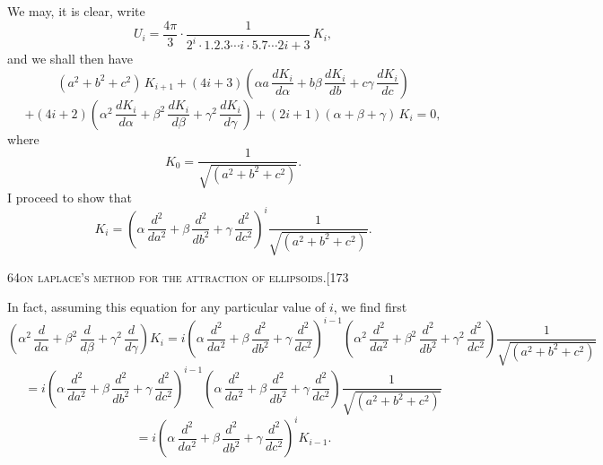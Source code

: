 \documentclass[11pt]{article}
\begin{document}
We may, it is clear, write
\[
U_{i} = \frac{4\pi}{3}\cdot\frac{1}{2^{i}\cdot 1.2.3 \cdots i\cdot 5.7 \cdots 2i + 3}\,K_{i},
\]
and we shall then have
\[
(a^{2} + b^{2} + c^{2})\,K_{i+1} + (4i + 3)\left(\alpha a\,\frac{dK_{i}}{d\alpha} + b\beta\,\frac{dK_{i}}{db} + c\gamma\,\frac{dK_{i}}{dc}\right)
\]
\[
+ (4i + 2)\left(\alpha^{2}\,\frac{dK_{i}}{d\alpha} + \beta^{2}\,\frac{dK_{i}}{d\beta} + \gamma^{2}\,\frac{dK_{i}}{d\gamma}\right) + (2i + 1)(\alpha + \beta + \gamma)\,K_{i} = 0,
\]
where
\[
K_{0} = \frac{1}{\sqrt{(a^{2} + b^{2} + c^{2})}}.
\]
I proceed to show that
\[
K_{i} = \left(\alpha\,\frac{d^{2}}{da^{2}} + \beta\,\frac{d^{2}}{db^{2}} + \gamma\,\frac{d^{2}}{dc^{2}}\right)^{i}\frac{1}{\sqrt{(a^{2} + b^{2} + c^{2})}}.
\]

\newpage

\begin{center}
\small\textsc{64}\hfill\textsc{on laplace's method for the attraction of ellipsoids.}\hfill[173
\end{center}

\medskip

\noindent In fact, assuming this equation for any particular value of $i$, we find first
\[
\left(\alpha^{2}\,\frac{d}{d\alpha} + \beta^{2}\,\frac{d}{d\beta} + \gamma^{2}\,\frac{d}{d\gamma}\right)K_{i} = i\left(\alpha\,\frac{d^{2}}{da^{2}} + \beta\,\frac{d^{2}}{db^{2}} + \gamma\,\frac{d^{2}}{dc^{2}}\right)^{i-1}\left(\alpha^{2}\,\frac{d^{2}}{da^{2}} + \beta^{2}\,\frac{d^{2}}{db^{2}} + \gamma^{2}\,\frac{d^{2}}{dc^{2}}\right)\frac{1}{\sqrt{(a^{2} + b^{2} + c^{2})}}
\]
\[
= i\left(\alpha\,\frac{d^{2}}{da^{2}} + \beta\,\frac{d^{2}}{db^{2}} + \gamma\,\frac{d^{2}}{dc^{2}}\right)^{i-1}\left(\alpha\,\frac{d^{2}}{da^{2}} + \beta\,\frac{d^{2}}{db^{2}} + \gamma\,\frac{d^{2}}{dc^{2}}\right)\frac{1}{\sqrt{(a^{2} + b^{2} + c^{2})}}
\]
\[
= i\left(\alpha\,\frac{d^{2}}{da^{2}} + \beta\,\frac{d^{2}}{db^{2}} + \gamma\,\frac{d^{2}}{dc^{2}}\right)^{i}K_{i-1}.
\]
\end{document}
